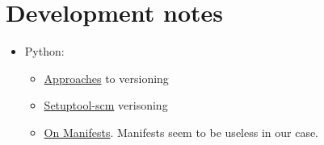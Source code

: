 \section{Development notes}

\begin{itemize}
  \item Python:
    \begin{itemize}
      \item
        \href{https://packaging.python.org/guides/single-sourcing-package-version/}{Approaches}
        to versioning
      \item
        \href{https://pypi.org/project/setuptools-scm/}{Setuptool-scm} verisoning
      \item
        \href{https://docs.python.org/3.7/distutils/sourcedist.html#manifest-template}{On
        Manifests}. Manifests seem to be useless in our case.
    \end{itemize}
\end{itemize}



